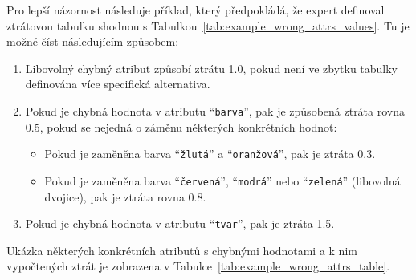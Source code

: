 Pro lepší názornost následuje příklad, který předpokládá, že expert definoval ztrátovou tabulku shodnou s Tabulkou~\ref{tab:example_wrong_attrs_values}.
Tu je možné číst následujícím způsobem:
\begin{enumerate}
	\item Libovolný chybný atribut způsobí ztrátu 1.0, pokud není ve zbytku tabulky definována více specifická alternativa.
	\item Pokud je chybná hodnota v atributu \enquote{\texttt{barva}}, pak je způsobená ztráta rovna 0.5, pokud se nejedná o záměnu některých konkrétních hodnot:
	      \begin{itemize}
		      \item Pokud je zaměněna barva \enquote{\texttt{žlutá}} a \enquote{\texttt{oranžová}}, pak je ztráta 0.3.
		      \item Pokud je zaměněna barva \enquote{\texttt{červená}}, \enquote{\texttt{modrá}} nebo \enquote{\texttt{zelená}} (libovolná dvojice), pak je ztráta rovna 0.8.
	      \end{itemize}
	\item Pokud je chybná hodnota v atributu \enquote{\texttt{tvar}}, pak je ztráta 1.5.
\end{enumerate}
Ukázka některých konkrétních atributů s chybnými hodnotami a k nim vypočtených ztrát je zobrazena v Tabulce~\ref{tab:example_wrong_attrs_table}.

